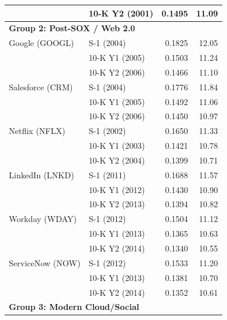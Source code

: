 \documentclass[12pt, letterpaper]{article}
\begin{document}
\begin{table}
\begin{tabular}{@{}llrr@{}}
                            & 10-K Y2 (2001)               & 0.1495 & 11.09 \\
        \midrule
        \multicolumn{4}{l}{\textbf{Group 2: Post-SOX / Web 2.0}} \\
        \addlinespace
        Google (GOOGL)      & S-1 (2004)                   & 0.1825 & 12.05 \\
                            & 10-K Y1 (2005)               & 0.1503 & 11.24 \\
                            & 10-K Y2 (2006)               & 0.1466 & 11.10 \\
        \addlinespace
        Salesforce (CRM)    & S-1 (2004)                   & 0.1776 & 11.84 \\
                            & 10-K Y1 (2005)               & 0.1492 & 11.06 \\
                            & 10-K Y2 (2006)               & 0.1450 & 10.97 \\
        \addlinespace
        Netflix (NFLX)      & S-1 (2002)                   & 0.1650 & 11.33 \\
                            & 10-K Y1 (2003)               & 0.1421 & 10.78 \\
                            & 10-K Y2 (2004)               & 0.1399 & 10.71 \\
        \addlinespace
        LinkedIn (LNKD)     & S-1 (2011)                   & 0.1688 & 11.57 \\
                            & 10-K Y1 (2012)               & 0.1430 & 10.90 \\
                            & 10-K Y2 (2013)               & 0.1394 & 10.82 \\
        \addlinespace
        Workday (WDAY)      & S-1 (2012)                   & 0.1504 & 11.12 \\
                            & 10-K Y1 (2013)               & 0.1365 & 10.63 \\
                            & 10-K Y2 (2014)               & 0.1340 & 10.55 \\
        \addlinespace
        ServiceNow (NOW)    & S-1 (2012)                   & 0.1533 & 11.20 \\
                            & 10-K Y1 (2013)               & 0.1381 & 10.70 \\
                            & 10-K Y2 (2014)               & 0.1352 & 10.61 \\
        \midrule
        \multicolumn{4}{l}{\textbf{Group 3: Modern Cloud/Social}} \\

\end{tabular}
\end{table}
\end{document}
